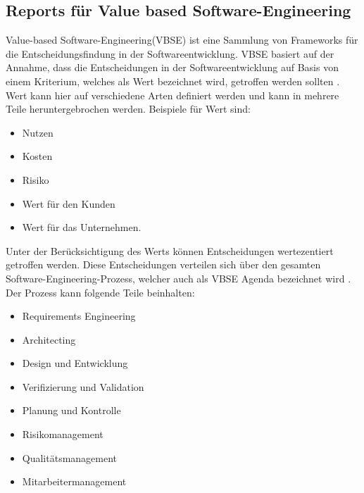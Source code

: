 \subsection{Reports für Value based Software-Engineering}
Value-based Software-Engineering(VBSE) ist eine Sammlung von Frameworks für die Entscheidungsfindung in der Softwareentwicklung. VBSE basiert auf der Annahme, dass die Entscheidungen in der Softwareentwicklung auf Basis von einem Kriterium, welches als Wert bezeichnet wird, getroffen werden sollten \cite{}.
Wert kann hier auf verschiedene Arten definiert werden und kann in mehrere Teile heruntergebrochen werden. Beispiele für Wert sind:
\begin{itemize}
  \item Nutzen
  \item Kosten
  \item Risiko
  \item Wert für den Kunden
  \item Wert für das Unternehmen.
\end{itemize}

Unter der Berücksichtigung des Werts können Entscheidungen wertezentiert getroffen werden. Diese Entscheidungen verteilen sich über den gesamten Software-Engineering-Prozess, welcher auch  als VBSE Agenda bezeichnet wird \cite{}.
Der Prozess kann folgende Teile beinhalten:
\begin{itemize}
  \item Requirements Engineering
  \item Architecting
  \item Design und Entwicklung
  \item Verifizierung und Validation
  \item Planung und Kontrolle
  \item Risikomanagement
  \item Qualitätsmanagement
  \item Mitarbeitermanagement
\end{itemize}



